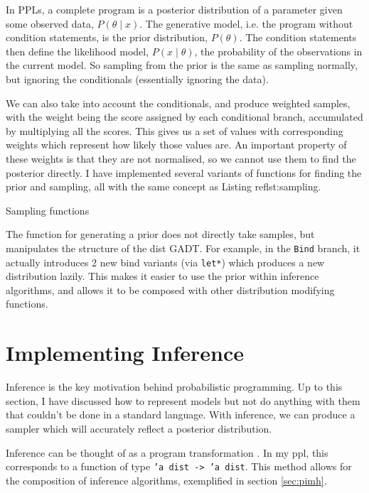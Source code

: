 \documentclass[sigconf]{acmart}
\begin{document}
In PPLs, a complete program is a posterior distribution of a parameter given some observed data, $P(\theta\mid x)$. The generative model, i.e. the program without condition statements, is the prior distribution, $P(\theta)$. The condition statements then define the likelihood model, $P(x\mid \theta)$, the probability of the observations in the current model. So sampling from the prior is the same as sampling normally, but ignoring the conditionals (essentially ignoring the data).

We can also take into account the conditionals, and produce weighted samples, with the weight being the score assigned by each conditional branch, accumulated by multiplying all the scores. This gives us a set of values with corresponding weights which represent how likely those values are. An important property of these weights is that they are not normalised, so we cannot use them to find the posterior directly. I have implemented several variants of functions for finding the prior and sampling, all with the same concept as Listing ref{lst:sampling}.

\begin{listing}[!htb]
  \centering
  \caption{Sampling functions}
  \label{lst:sampling}
\end{listing}

The function for generating a prior does not directly take samples, but manipulates the structure of the dist GADT. For example, in the \texttt{Bind} branch, it actually introduces 2 new bind variants (via \texttt{let*}) which produces a new distribution lazily. This makes it easier to use the prior within inference algorithms, and allows it to be composed with other distribution modifying functions.

\section{Implementing Inference} \label{sec:inference}

Inference is the key motivation behind probabilistic programming. Up to this section, I have discussed how to represent models but not do anything with them that couldn't be done in a standard language. With inference, we can produce a sampler which will accurately reflect a posterior distribution.

Inference can be thought of as a program transformation \cite{scibior2015practical, Zinkov2016ComposingIA}. In my ppl, this corresponds to a function of type \texttt{'a dist -> 'a dist}. This method allows for the composition of inference algorithms, exemplified in section \ref{sec:pimh}.
\end{document}

